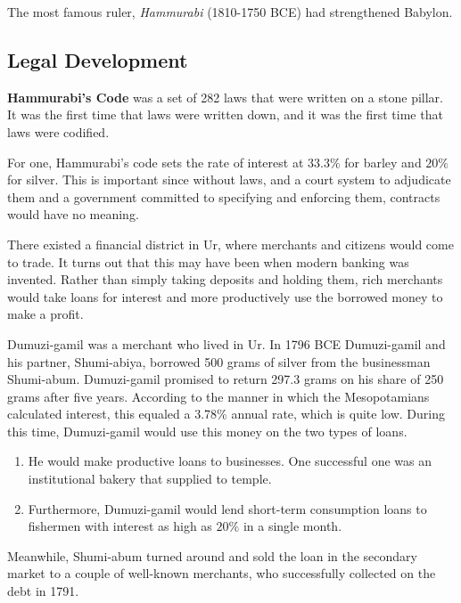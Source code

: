 \documentclass{article}
\begin{document}
  The most famous ruler, \textit{Hammurabi} (1810-1750 BCE) had strengthened Babylon. 

  \subsection{Legal Development}

    \begin{legal}
      \textbf{Hammurabi's Code} was a set of 282 laws that were written on a stone pillar. It was the first time that laws were written down, and it was the first time that laws were codified.
    \end{legal}

    For one, Hammurabi's code sets the rate of interest at $33.3\%$ for barley and $20\%$ for silver. This is important since without laws, and a court system to adjudicate them and a government committed to specifying and enforcing them, contracts would have no meaning. 

    There existed a financial district in Ur, where merchants and citizens would come to trade. It turns out that this may have been when modern banking was invented. Rather than simply taking deposits and holding them, rich merchants would take loans for interest and more productively use the borrowed money to make a profit. 

    \begin{example}
      \label{ex:dumuzi-gamil}
      Dumuzi-gamil was a merchant who lived in Ur. In 1796 BCE Dumuzi-gamil and his partner, Shumi-abiya, borrowed 500 grams of silver from the businessman Shumi-abum. Dumuzi-gamil promised to return 297.3 grams on his share of 250 grams after five years. According to the manner in which the Mesopotamians calculated interest, this equaled a 3.78\% annual rate, which is quite low. During this time, Dumuzi-gamil would use this money on the two types of loans. 
      \begin{enumerate}
        \item He would make productive loans to businesses. One successful one was an institutional bakery that supplied to temple. 
        \item Furthermore, Dumuzi-gamil would lend short-term consumption loans to fishermen with interest as high as $20\%$ in a single month. 
      \end{enumerate}
      Meanwhile, Shumi-abum turned around and sold the loan in the secondary market to a couple of well-known merchants, who successfully collected on the debt in 1791.
    \end{example}
\end{document}
